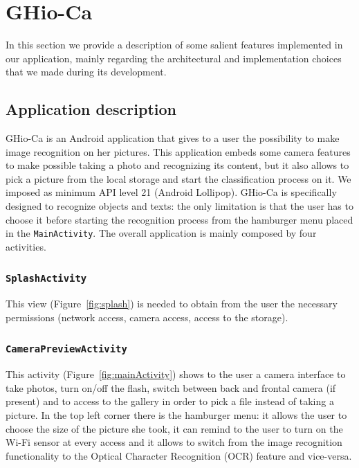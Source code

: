 \section{GHio-Ca}
\label{sec:ghioca}
In this section we provide a description of some salient features implemented 
in our application, mainly regarding the architectural and implementation choices 
that we made during its development.

\subsection{Application description}
GHio-Ca is an Android application that gives to a user the possibility to make
image recognition on her pictures. This application embeds some camera features
to make possible taking a photo and recognizing its content, but it also allows
to pick a picture from the local storage and start the classification process
on it. We imposed as minimum API level 21 (Android Lollipop).
GHio-Ca is specifically designed to recognize objects and texts: the only
limitation is that the user has to choose it before starting the recognition
process from the hamburger menu placed in the \texttt{MainActivity}.
The overall application is mainly composed by four activities.

\subsubsection{\texttt{SplashActivity}}
This view (Figure~\ref{fig:splash}) is needed to obtain from the user
the necessary permissions (network access, camera access, access to  the
storage).

\subsubsection{\texttt{CameraPreviewActivity}}
This activity (Figure~\ref{fig:mainActivity}) shows to the user a camera
interface  to take photos, turn on/off the flash, switch between back and
frontal camera (if present) and to access to the gallery in order to pick a file
instead of taking a picture. In the top left corner there is the hamburger
menu: it allows the user to choose the size of the picture she took, it can remind 
to the user to turn on the Wi-Fi sensor at every access and it allows to switch 
from the image recognition functionality to the Optical Character Recognition (OCR)
feature and vice-versa.

